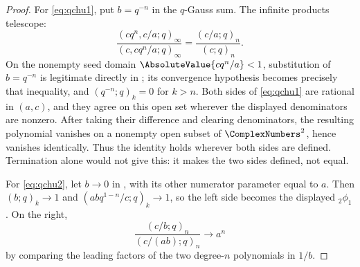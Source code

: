 \documentclass[11pt,a4paper,oneside,openany]{book}
\theoremstyle{definition}
\theoremstyle{remark}
\begin{document}
\begin{proof}
For \eqref{eq:qchu1}, put $b=q^{-n}$ in the $q$-Gauss sum.  The infinite products telescope:
\[
 \frac{(cq^n,c/a;q)_\infty}{(c,cq^n/a;q)_\infty}
 =\frac{(c/a;q)_n}{(c;q)_n}.
\]
On the nonempty seed domain $\AbsoluteValue{cq^n/a}<1$, substitution of
$b=q^{-n}$ is legitimate directly in ; its convergence
hypothesis becomes precisely that inequality, and
$(q^{-n};q)_k=0$ for $k>n$.  Both sides of \eqref{eq:qchu1} are rational in
$(a,c)$, and they agree on this open set wherever the displayed denominators
are nonzero.  After taking their difference and clearing denominators, the
resulting polynomial vanishes on a nonempty open subset of
$\ComplexNumbers^2$, hence vanishes identically.  Thus the identity holds
wherever both sides are defined.  Termination alone would not give this: it
makes the two sides defined, not equal.

For \eqref{eq:qchu2}, let $b\to0$ in , with its other numerator parameter equal to $a$.  Then $(b;q)_k\to1$ and $(abq^{1-n}/c;q)_k\to1$, so the left side becomes the displayed ${}_2\phi_1$.  On the right,
\[
 \frac{(c/b;q)_n}{(c/(ab);q)_n}\longrightarrow a^n
\]
by comparing the leading factors of the two degree-$n$ polynomials in $1/b$.
\end{proof}
\end{document}
